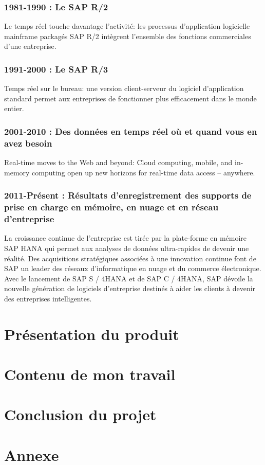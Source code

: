 \documentclass[12pt]{article}
\begin{document}
    \subsubsection{1981-1990 : Le SAP R/2}
    Le temps réel touche davantage l’activité: les processus d’application logicielle mainframe packagés SAP R/2 intègrent l’ensemble des fonctions commerciales d’une entreprise.

    \subsubsection{1991-2000 : Le SAP R/3}
    Temps réel sur le bureau: une version client-serveur du logiciel d'application standard permet aux entreprises de fonctionner plus efficacement dans le monde entier.
    \subsubsection{2001-2010 : Des données en temps réel où et quand vous en avez besoin}
    Real-time moves to the Web and beyond: Cloud computing, mobile, and in-memory computing open up new horizons for real-time data access – anywhere.
    
    \subsubsection{2011-Présent : Résultats d'enregistrement des supports de prise en charge en mémoire, en nuage et en réseau d'entreprise}
    La croissance continue de l'entreprise est tirée par la plate-forme en mémoire SAP HANA qui permet aux analyses de données ultra-rapides de devenir une réalité. Des acquisitions stratégiques associées à une innovation continue font de SAP un leader des réseaux d’informatique en nuage et du commerce électronique. Avec le lancement de SAP S / 4HANA et de SAP C / 4HANA, SAP dévoile la nouvelle génération de logiciels d'entreprise destinés à aider les clients à devenir des entreprises intelligentes.
    
\newpage
\section{Présentation du produit}

\newpage
\section{Contenu de mon travail}


\section{Conclusion du projet}
\paragraph{}

\newpage


\newpage
\section{Annexe}
\newpage

\end{document}

